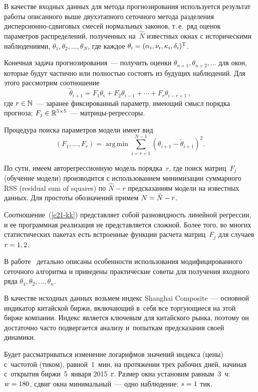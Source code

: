 \begin{multicols}{2}
В качестве входных данных для метода прогнозирования используется
результат работы описанного выше двухэтапного сеточного метода
разделения дис\-пер\-си\-он\-но-сдви\-го\-вых смесей нормальных законов, т.\,е.\
ряд оценок параметров распределений, полученных на~$\hat N$
известных окнах с историческими наблюдениями, $\theta_1, \theta_2,
\ldots, \theta_N$, где каждое $\theta_i\hm =
(\alpha_i,\nu_i,\kappa_i,\delta_i)^{\mathrm{T}}$.

Конечная задача прогнозирования~--- получить оценки $\theta_{n+1},
\theta_{n+2}, \ldots$ для окон, которые будут час\-тично или полностью
состоять из будущих наблюдений. Для этого рассмотрим соотношение
$$
\tilde \theta_{i+1} = F_1  \theta_i +  F_2  \theta_{i-1} + \cdots +
F_r \theta_{i-r+1}\,,
$$
где $r\in\mathbb N$~--- заранее фиксированный параметр, имеющий смысл
порядка прогноза; $F_j \hm\in \mathbb{R}^{5 \times 5}$~--- мат\-ри\-цы-рег\-рес\-соры.

Процедура поиска параметров модели имеет вид
\begin{equation}
(F_1, \ldots, F_r) = \mathop{\mathrm{arg\,min}} \sum\limits_{i=r+1}^{N-1}\left(
\theta_{i+1}- \tilde \theta_{i+1} \right)^2\!.\! \label{e21-kk}
\end{equation}

По сути, имеем авторегрессионную модель порядка~$r$, где поиск
матриц~$F_j$ (обучение модели) производится с использованием
минимизации суммарного RSS (residual sum of squares)
по $\hat N-r$ предсказаниям модели на
известных данных. Для простоты обозначений примем $N \hm= \hat N - r$.

Соотношение~(\ref{e21-kk}) представляет собой разновидность линейной
регрессии, и ее программная реализация не представляется сложной.
Более того, во многих статистических пакетах есть встроенные функции
расчета матриц~$F_j$ для случаев $r\hm=1, 2$.


В работе~\cite{kya2015} детально описаны особенности использования
модифицированного сеточного алгоритма и приведены практические
советы для получения входного ряда $\theta_1, \theta_2, \ldots,
\theta_n$.

В качестве исходных данных возьмем индекс Shanghai Composite~---
основной индикатор китайской биржи, включающий в~себя все
торгующиеся на этой бирже компании. Индекс является ключевым для
китайского рынка, поэтому он достаточно часто подвергается анализу 
и~попыткам предсказания своей динамики.

Будет рассматриваться изменение логарифмов значений индекса (цены) 
с~частотой (тиком), равной~1~мин, на протяжении трех рабочих дней,
начиная с~открытия биржи~5~января 2015~г. Размер окна установим
равным~3~ч: $w\hm=180$, сдвиг окна минимальный~--- одно наблюдение:
$s\hm=1$ тик.


\end{multicols}
